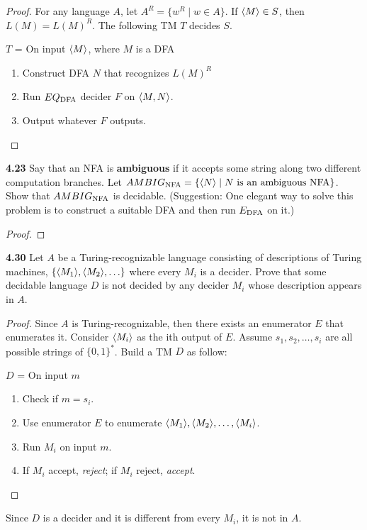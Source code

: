 \begin{mdframed}
\begin{proof}
For any language $A$, let $A^R = \{w^R \mid w \in A\}$. If $\langle{M}\rangle\in S$, then $L(M) = L(M)^R$. The following TM $T$ decides $S$.

\medskip
$T$ = On input $\langle{M}\rangle$, where $M$ is a DFA
\begin{enumerate}
\item Construct DFA $N$ that recognizes $L(M)^R$
\item Run $EQ_{\text{DFA}}$ decider $F$ on $\langle{M, N}\rangle$.
\item Output whatever $F$ outputs.
\end{enumerate}
\end{proof}
\end{mdframed}

\textbf{4.23} Say that an NFA is \textbf{ambiguous} if it accepts some string along two different computation branches. Let $AMBIG_{\text{NFA}} = \{\langle{N}\rangle \mid \text{$N$ is an ambiguous NFA} \}$. Show that $AMBIG_{\text{NFA}}$ is decidable. (Suggestion: One elegant way to solve this problem is to construct a suitable DFA and then run $E_{\text{DFA}}$ on it.)

\begin{mdframed}
\begin{proof}

\end{proof}
\end{mdframed}

\textbf{4.30}  Let $A$ be a Turing-recognizable language consisting of descriptions of Turing machines, $\{\langle{M_1}\rangle, \langle{M_2}\rangle, \ldots\}$ where every $M_i$ is a decider. Prove that some decidable language $D$ is not decided by any decider $M_i$ whose description appears in $A$.
\begin{mdframed}
\begin{proof}
Since $A$ is Turing-recognizable, then there exists an enumerator $E$ that enumerates it. Consider $\langle{M_i}\rangle$ as the ith output of $E$. Assume $s_1, s_2, \ldots, s_i$ are all possible strings of $\{0,1\}^*$. Build a TM $D$ as follow:

\medskip
$D$ = On input $m$
\begin{enumerate}
\item Check if $m = s_i$.
\item Use enumerator $E$ to enumerate $\langle{M_1}\rangle, \langle{M_2}\rangle, \ldots, \langle{M_i}\rangle$.
\item Run $M_i$ on input $m$.
\item If $M_i$ accept, \textit{reject}; if $M_i$ reject, \textit{accept}.
\end{enumerate}
\end{proof}

Since $D$ is a decider and it is different from every $M_i$, it is not in $A$.
\end{mdframed}